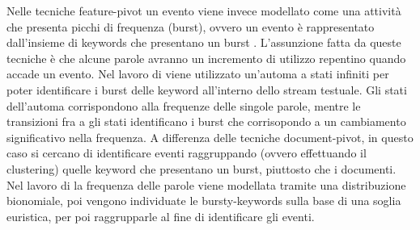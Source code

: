 Nelle tecniche feature-pivot un evento viene invece modellato come una attività che presenta picchi di frequenza (burst), ovvero un evento è rappresentato dall'insieme di keywords che presentano un burst \cite{Allan:2002:TDT:772260}. L'assunzione fatta da queste tecniche è che alcune parole avranno un incremento di utilizzo repentino quando accade un evento. Nel lavoro di \cite{Kleinberg:2002:BHS:775047.775061} viene utilizzato un'automa a stati infiniti per poter identificare i burst delle keyword all'interno dello stream testuale. Gli stati dell'automa corrispondono alla frequenze delle singole parole, mentre le transizioni fra a gli stati identificano i burst che corrisopondo a un  cambiamento significativo nella frequenza.
A differenza delle tecniche document-pivot, in questo caso si cercano di identificare eventi raggruppando (ovvero effettuando il clustering)   quelle keyword che presentano un burst, piuttosto che i documenti. Nel lavoro di \cite{Allan:2002:TDT:772260} la frequenza delle parole viene modellata tramite una distribuzione bionomiale, poi vengono individuate le bursty-keywords sulla base di una soglia euristica, per poi raggrupparle al fine di identificare gli eventi.
